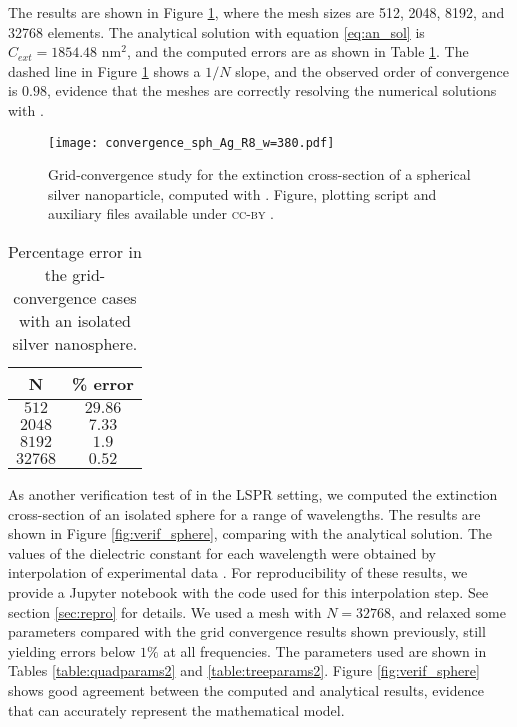 The results are shown in Figure \ref{fig:error_sphere_Ag}, where the mesh sizes are
512, 2048, 8192, and 32768 elements. 
The analytical solution with equation \eqref{eq:an_sol} is $C_{ext} = 1854.48$ nm$^2$, 
and the computed errors are as shown in Table \ref{table:err_iso_sphere}.
The dashed line in Figure \ref{fig:error_sphere_Ag} shows a $1/N$ slope, 
and the observed order of convergence is $0.98$,  
evidence that the meshes are correctly resolving the numerical solutions with \pygbe. 


\begin{figure}[h] %
   \centering
   \texttt{[image: convergence\_sph\_Ag\_R8\_w=380.pdf]} 
   \caption{Grid-convergence study for the extinction cross-section of a spherical silver
            nanoparticle, computed with \pygbe. Figure, plotting script and auxiliary files available under \textsc{cc-by} \cite{ClementiETal2018c}.}
   \label{fig:error_sphere_Ag}
\end{figure}



\begin{table}[h]
    \centering
    \caption{\label{table:err_iso_sphere} Percentage error in the grid-convergence cases with an isolated silver nanosphere.} 
    \begin{tabular}{c c}
    \hline%
    N & \% error \\
    \hline%
     $512$ & $29.86$ \\
     $2048$ & $7.33$ \\
     $8192$ & $1.9$ \\
     $32768$ & $0.52$ \\
    \hline%
    \end{tabular}
\end{table}

As another verification test of \pygbe in the LSPR setting, we computed the extinction cross-section of an 
isolated sphere for a range of wavelengths. 
The results are shown in Figure \ref{fig:verif_sphere}, comparing with the analytical solution. 
The values of the dielectric constant for each wavelength were obtained by interpolation of 
experimental data \cite{JohnsonChristy1972, HaleQuerry1972}.
For reproducibility of these results, we provide a Jupyter notebook with the code used for this interpolation step.
See section \ref{sec:repro} for details.
We used a mesh with $N=32768$, and relaxed some parameters compared with the grid convergence results shown previously, still yielding errors below $1\%$ at all frequencies.
The parameters used are shown in Tables \ref{table:quadparams2} and \ref{table:treeparams2}.
Figure \ref{fig:verif_sphere} shows good agreement between the computed and analytical results, 
evidence that \pygbe can accurately represent the mathematical model. 


